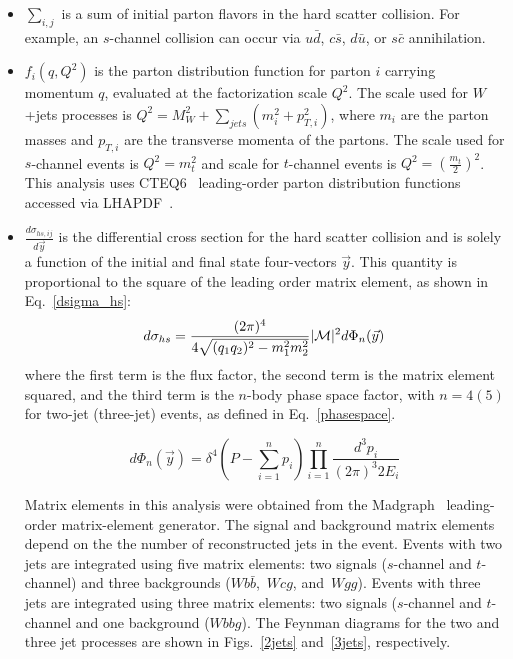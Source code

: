 \begin{itemize}
\item $\sum_{i,j}$ is a sum of initial parton flavors in the hard
scatter collision. For example, an $s$-channel collision can occur via
$u\bar{d}$, $c\bar{s}$, $d\bar{u}$, or $s\bar{c}$ annihilation.

\item $f_{i}(q, Q^{2})$ is the parton distribution function for parton
$i$ carrying momentum $q$,
evaluated at the factorization scale $Q^2$. The scale used for $W$+jets processes is  $Q^2=M_{W}^{2} + \sum_{jets}({m_{i}^2 + p_{T,i}^2})$, where $m_{i}$ are the parton masses and $p_{T,i}$ are the transverse momenta of the partons. The scale used for
$s$-channel events is $Q^2=m_t^2$ and scale for $t$-channel events is $Q^{2} = \left( \frac{m_{t}}{2} \right)^{2}$. This analysis uses
CTEQ6~\cite{Pumplin:2005rh} leading-order parton distribution
functions accessed via LHAPDF~\cite{Bourilkov:2006cj}.

\item $\frac{d\sigma_{hs,ij}}{d\vec{y}}$ is the
differential cross section for the hard scatter collision and is solely a function of the initial and final state four-vectors $\vec{y}$. This
quantity is proportional to the square of the leading order matrix
element, as shown in Eq.~\ref{dsigma_hs}:
\begin{equation}
\label{dsigma_hs}
d\sigma_{hs}
= \frac{(2\pi)^4}{4\sqrt{(q_{1}q_{2})^2 - m_{1}^2m_{2}^2}}
|{\cal M}|^{2}
d\Phi_{n}(\vec{y})
\end{equation}
\noindent where the first term is the flux factor, the second term is
the matrix element squared, and the third term is the $n$-body phase
space factor, with $n=4(5)$ for two-jet (three-jet) events, as defined in Eq.~\ref{phasespace}. 

\begin{equation}
\label{phasespace}
d\Phi_{n}(\vec{y}) = \delta^{4}(P - \sum_{i=1}^{n}p_{i}) \prod_{i=1}^{n} \frac{d^{3}p_{i}}{(2\pi)^{3}2E_{i}}
\end{equation}

Matrix elements in this analysis were obtained from the
Madgraph~\cite{Maltoni:2002qb} leading-order matrix-element generator. The signal and background matrix elements depend on the the number of reconstructed jets in the event. Events with two jets are integrated using five matrix elements: two signals ($s$-channel and $t$-channel) and three backgrounds ($Wb\bar{b}$,~$Wcg$, and~$Wgg$). Events with three jets are integrated using three matrix elements: two signals ($s$-channel and $t$-channel and one background ($Wbbg$). The Feynman diagrams for the two and three jet processes are shown in Figs.~\ref{2jets} and~\ref{3jets}, respectively.


\end{itemize}
